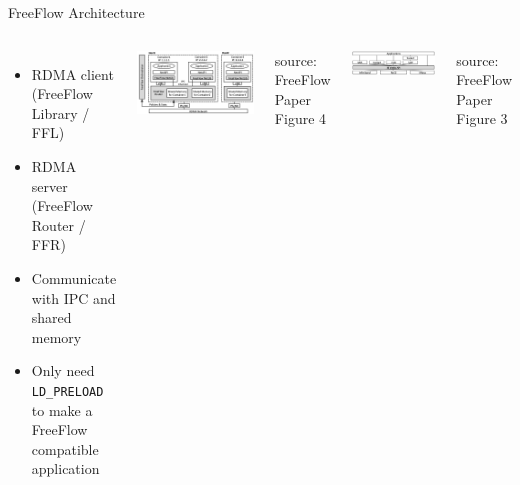 \documentclass{beamer}
\begin{document}
\begin{frame}{FreeFlow Architecture}
    \begin{columns}
    \begin{itemize}
        \item RDMA client (FreeFlow Library / FFL)
        \item RDMA server (FreeFlow Router / FFR)
        \item Communicate with IPC and shared memory
        \item Only need \texttt{LD\_PRELOAD} to make a FreeFlow compatible application
    \end{itemize}
        \includegraphics[width=\textwidth]{freeflowarch.png}
        \vspace{-25pt}
        \begin{center}
            \fontsize{4pt}{4pt}\selectfont source: FreeFlow Paper Figure 4
        \end{center}

        \includegraphics[width=\textwidth]{freeflowibverbsstack.png}
        \vspace{-25pt}
        \begin{center}
            \fontsize{4pt}{4pt}\selectfont source: FreeFlow Paper Figure 3
        \end{center}
    \end{columns}
\end{frame}
\end{document}
